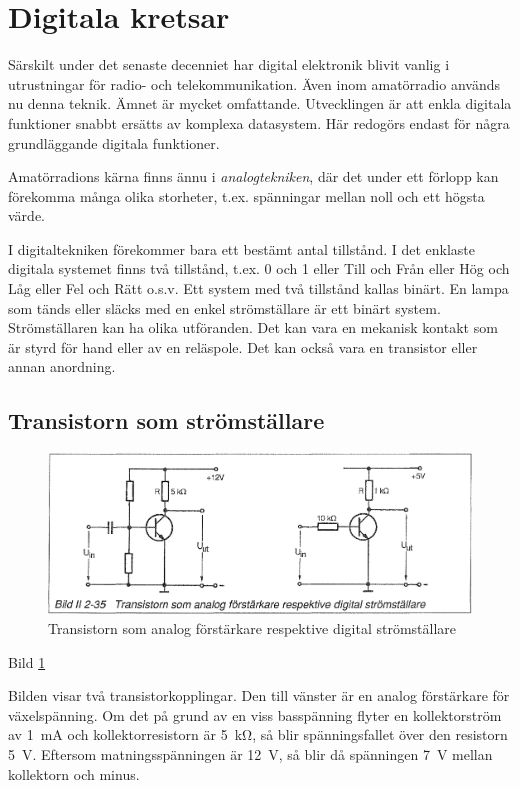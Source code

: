 \section{Digitala kretsar}
\label{digitala kretsar}

Särskilt under det senaste decenniet har digital elektronik blivit vanlig i
utrustningar för radio- och telekommunikation. Även inom amatörradio används nu
denna teknik. Ämnet är mycket omfattande. Utvecklingen är att enkla digitala
funktioner snabbt ersätts av komplexa datasystem. Här redogörs endast för några
grundläggande digitala funktioner.

Amatörradions kärna finns ännu i \emph{analogtekniken}, där det under ett
förlopp kan förekomma många olika storheter, t.ex. spänningar mellan noll och
ett högsta värde.

I digitaltekniken förekommer bara ett bestämt antal tillstånd. I det enklaste
digitala systemet finns två tillstånd, t.ex. 0 och 1 eller Till och Från eller
Hög och Låg eller Fel och Rätt o.s.v. Ett system med två tillstånd kallas
binärt. En lampa som tänds eller släcks med en enkel strömställare är ett binärt
system. Strömställaren kan ha olika utföranden. Det kan vara en mekanisk kontakt
som är styrd för hand eller av en reläspole. Det kan också vara en transistor
eller annan anordning.

\subsection{Transistorn som strömställare}

\begin{figure}
\includegraphics[width=\textwidth]{images/bild_2_2-35}
\caption{Transistorn som analog förstärkare respektive digital strömställare}
\label{fig:BildII2-35}
\end{figure}

Bild \ref{fig:BildII2-35}

Bilden visar två transistorkopplingar. Den till vänster är en analog förstärkare
för växelspänning. Om det på grund av en viss basspänning flyter en
kollektorström av 1~mA och kollektorresistorn är 5~kΩ, så blir spänningsfallet
över den resistorn 5~V. Eftersom matningsspänningen är 12~V, så blir då
spänningen 7~V mellan kollektorn och minus.

